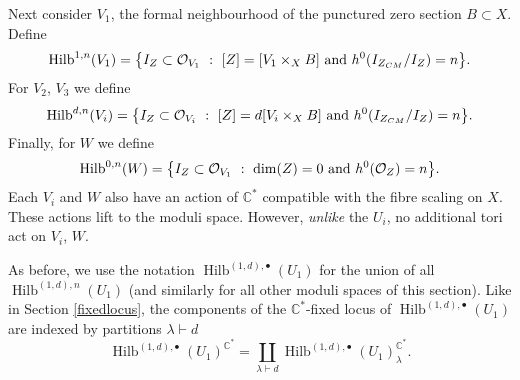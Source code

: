 \documentclass{amsart}
\theoremstyle{definition}
\newcommand{\CC} {\mathbb{C}}          %
\renewcommand{\O}{\mathcal{O}}
\newcommand{\Hilb}{\operatorname{Hilb}}
\begin{document}
Next consider $V_1$, the formal neighbourhood of the punctured zero section $B \subset X$. Define
$$
\Hilb^{1,n}(V_1) = \big\{ I_Z \subset \O_{V_1} \ : \ [Z] = [V_1 \times_X B] \ {\rm{and}} \ h^0(I_{Z_{CM}} / I_Z) = n \big\}.
$$
For $V_2$, $V_3$ we define
$$
\Hilb^{d,n}(V_i) = \big\{ I_Z \subset \O_{V_i} \ : \ [Z] = d [V_i \times_X B] \ {\rm{and}} \ h^0(I_{Z_{CM}} / I_Z) = n \big\}.
$$
Finally, for $W$ we define
$$
\Hilb^{0,n}(W) = \big\{ I_Z \subset \O_{V_1} \ : \ \dim(Z) = 0 \ {\rm{and}} \ h^0(\O_Z) = n \big\}.
$$
Each $V_i$ and $W$ also have an action of $\CC^*$ compatible with the fibre scaling on $X$. These actions lift to the moduli space. However, \emph{unlike} the $U_i$, no additional tori act on $V_i$, $W$.

As before, we use the notation $\Hilb^{(1,d),\bullet}(U_1)$ for the union of all $\Hilb^{(1,d),n}(U_1)$ (and similarly for all other moduli spaces of this section). Like in Section \ref{fixedlocus}, the components of the $\CC^*$-fixed locus of $\Hilb^{(1,d),\bullet}(U_1)$ are indexed by partitions $\lambda \vdash d$
$$
\Hilb^{(1,d),\bullet}(U_1)^{\CC^*} = \coprod_{\lambda \vdash d} \Hilb^{(1,d),\bullet}(U_1)_{\lambda}^{\CC^*}.
$$
\end{document}
